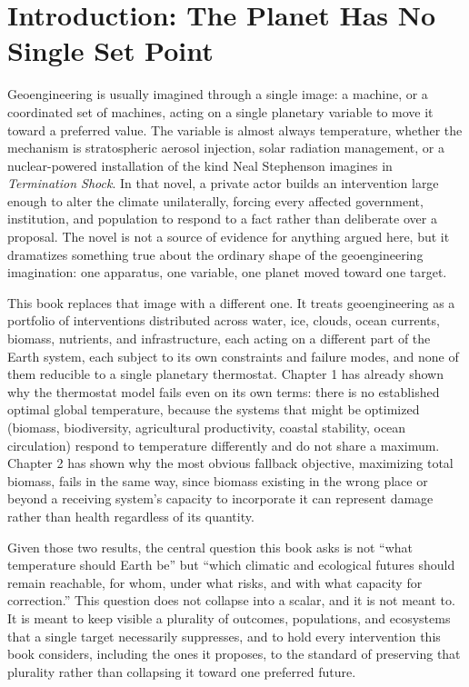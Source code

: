 \documentclass[11pt,oneside]{book}
\begin{document}
\tableofcontents

\chapter*{Introduction: The Planet Has No Single Set Point}

Geoengineering is usually imagined through a single image: a machine, or a coordinated set of machines, acting on a single planetary variable to move it toward a preferred value. The variable is almost always temperature, whether the mechanism is stratospheric aerosol injection, solar radiation management, or a nuclear-powered installation of the kind Neal Stephenson imagines in \textit{Termination Shock}. In that novel, a private actor builds an intervention large enough to alter the climate unilaterally, forcing every affected government, institution, and population to respond to a fact rather than deliberate over a proposal. The novel is not a source of evidence for anything argued here, but it dramatizes something true about the ordinary shape of the geoengineering imagination: one apparatus, one variable, one planet moved toward one target.

This book replaces that image with a different one. It treats geoengineering as a portfolio of interventions distributed across water, ice, clouds, ocean currents, biomass, nutrients, and infrastructure, each acting on a different part of the Earth system, each subject to its own constraints and failure modes, and none of them reducible to a single planetary thermostat. Chapter 1 has already shown why the thermostat model fails even on its own terms: there is no established optimal global temperature, because the systems that might be optimized (biomass, biodiversity, agricultural productivity, coastal stability, ocean circulation) respond to temperature differently and do not share a maximum. Chapter 2 has shown why the most obvious fallback objective, maximizing total biomass, fails in the same way, since biomass existing in the wrong place or beyond a receiving system's capacity to incorporate it can represent damage rather than health regardless of its quantity.

Given those two results, the central question this book asks is not ``what temperature should Earth be'' but ``which climatic and ecological futures should remain reachable, for whom, under what risks, and with what capacity for correction.'' This question does not collapse into a scalar, and it is not meant to. It is meant to keep visible a plurality of outcomes, populations, and ecosystems that a single target necessarily suppresses, and to hold every intervention this book considers, including the ones it proposes, to the standard of preserving that plurality rather than collapsing it toward one preferred future.
\end{document}
